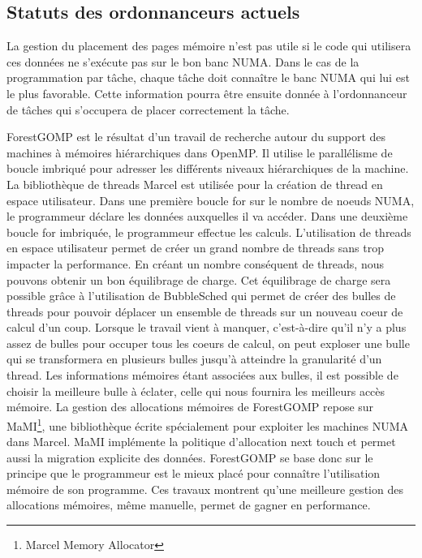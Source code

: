 \subsection{Statuts des ordonnanceurs actuels}
La gestion du placement des pages mémoire n'est pas utile si le code qui utilisera ces données ne s'exécute pas sur le bon banc NUMA.
%
Dans le cas de la programmation par tâche, chaque tâche doit connaître le banc NUMA qui lui est le plus favorable.
%
Cette information pourra être ensuite donnée à l'ordonnanceur de tâches qui s'occupera de placer correctement la tâche.


ForestGOMP\cite{Bro10Thesis} est le résultat d'un travail de recherche autour du support des machines à mémoires hiérarchiques dans OpenMP.
%
Il utilise le parallélisme de boucle imbriqué pour adresser les différents niveaux hiérarchiques de la machine.
%
La bibliothèque de threads Marcel\cite{marcel} est utilisée pour la création de thread en espace utilisateur.
%
Dans une première boucle for sur le nombre de noeuds NUMA, le programmeur déclare les données auxquelles il va accéder.
%
Dans une deuxième boucle for imbriquée, le programmeur effectue les calculs.
%
L'utilisation de threads en espace utilisateur permet de créer un grand nombre de threads sans trop impacter la performance.
%
En créant un nombre conséquent de threads, nous pouvons obtenir un bon équilibrage de charge.
%
Cet équilibrage de charge sera possible grâce à l'utilisation de BubbleSched\cite{bubblesched} qui permet de créer des bulles de threads pour pouvoir déplacer un ensemble de threads sur un nouveau coeur de calcul d'un coup.
%
Lorsque le travail vient à manquer, c'est-à-dire qu'il n'y a plus assez de bulles pour occuper tous les coeurs de calcul, on peut exploser une bulle qui se transformera en plusieurs bulles jusqu'à atteindre la granularité d'un thread.
%
Les informations mémoires étant associées aux bulles, il est possible de choisir la meilleure bulle à éclater, celle qui nous fournira les meilleurs accès mémoire.
%
La gestion des allocations mémoires de ForestGOMP repose sur MaMI\footnote{Marcel Memory Allocator}, une bibliothèque écrite spécialement pour exploiter les machines NUMA dans Marcel.
%
MaMI implémente la politique d'allocation next touch et permet aussi la migration explicite des données.
%
ForestGOMP se base donc sur le principe que le programmeur est le mieux placé pour connaître l'utilisation mémoire de son programme.
%
Ces travaux montrent qu'une meilleure gestion des allocations mémoires, même manuelle, permet de gagner en performance.


